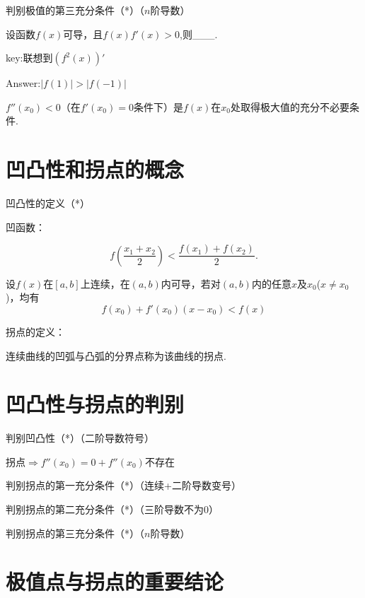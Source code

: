 \documentclass[12pt, a4paper, oneside]{ctexbook}
\begin{document}
\hspace*{\fill}

判别极值的第三充分条件（*）（$n$阶导数）

\hspace*{\fill}

设函数$f(x)$可导，且$f(x)f'(x)>0$,则\_\_\_.

key:联想到$(f^2(x))'$

Answer:$|f(1)|>|f(-1)|$

\hspace*{\fill}

$f''(x_0)<0$（在$f'(x_0)=0$条件下）是$f(x)$在$x_0$处取得极大值的充分不必要条件.

\hspace*{\fill}


\section{凹凸性和拐点的概念}

凹凸性的定义（*）

凹函数：

\[f(\dfrac{x_1+x_2}{2})<\dfrac{f(x_1)+f(x_2)}{2}.\]


设$f(x)$在$[a,b]$上连续，在$(a,b)$内可导，若对$(a,b)$内的任意$x$及$x_0$($x\neq x_0$)，均有\[f(x_0)+f'(x_0)(x-x_0)<f(x)\]

\hspace*{\fill}

拐点的定义：

连续曲线的凹弧与凸弧的分界点称为该曲线的拐点.

\section{凹凸性与拐点的判别}

判别凹凸性（*）（二阶导数符号）

\hspace*{\fill}

拐点$\Rightarrow$$f''(x_0)=0+f''(x_0)$不存在

\hspace*{\fill}

判别拐点的第一充分条件（*）（连续+二阶导数变号）

判别拐点的第二充分条件（*）（三阶导数不为0）

判别拐点的第三充分条件（*）（$n$阶导数）

\hspace*{\fill}


\section{极值点与拐点的重要结论}
\end{document}
